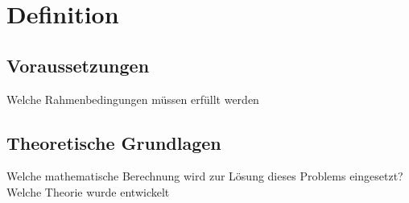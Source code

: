 \section{Definition}
\label{sec:definition}


\subsection{Voraussetzungen} 
\label{sec:voraussetzungen}
Welche Rahmenbedingungen müssen erfüllt werden


\subsection{Theoretische Grundlagen} 
\label{sec:theoretische Grundlagen}
Welche mathematische Berechnung wird zur Lösung dieses Problems eingesetzt? Welche Theorie wurde entwickelt



